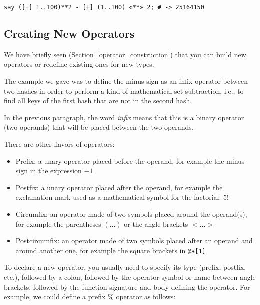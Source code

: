 \begin{verbatim}
say ([+] 1..100)**2 - [+] (1..100) «**» 2; # -> 25164150
\end{verbatim}

\subsection{Creating New Operators}

We have briefly seen (Section~\ref{operator_construction}) 
that you can build new operators or redefine existing ones 
for new types.

The example we gave was to define the minus sign 
as an infix operator between two hashes in order to 
perform a kind of mathematical set subtraction, i.e., 
to find all keys of the first hash that are not in the 
second hash.

In the previous paragraph, the word \emph{infix} means 
that this is a binary operator (two operands) that will 
be placed between the two operands. 

There are other flavors of operators:
\begin{itemize}
\item Prefix: a unary operator placed before the operand, 
for example the minus sign in the expression $-1$

\item Postfix: a unary operator placed after the operand, 
for example the exclamation mark used as a mathematical  
symbol for the factorial: $5!$

\item Circumfix: an operator made of two symbols placed 
around the operand(s), for example the parentheses $(...)$ 
or the angle brackets $<...>$

\item Postcircumfix: an operator made of two symbols placed 
after an operand and around another one, for example the 
square brackets in \verb'@a[1]'
\end{itemize}

To declare a new operator, you usually need to specify 
its type (prefix, postfix, etc.), followed by a colon, 
followed by the operator symbol or name between angle brackets, 
followed by the function signature and body defining 
the operator. For example, we could define a prefix \% 
operator as follows:

